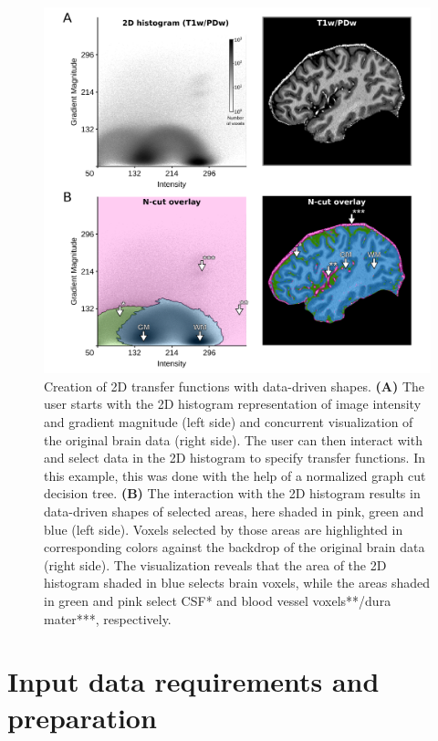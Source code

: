 \begin{figure}[htb!]
\centering
\includegraphics[width=\textwidth]{figures/chapter_02/figure_3.png}
\caption{Creation of 2D transfer functions with data-driven shapes. \textbf{(A)} The user starts with the 2D histogram representation of image intensity and gradient magnitude (left side) and concurrent visualization of the original brain data (right side). The user can then interact with and select data in the 2D histogram to specify transfer functions. In this example, this was done with the help of a normalized graph cut decision tree. \textbf{(B)} The interaction with the 2D histogram results in data-driven shapes of selected areas, here shaded in pink, green and blue (left side). Voxels selected by those areas are highlighted in corresponding colors against the backdrop of the original brain data (right side). The visualization reveals that the area of the 2D histogram shaded in blue selects brain voxels, while the areas shaded in green and pink select CSF* and blood vessel voxels**/dura mater***, respectively.}
\label{Fig3}
\end{figure}

\section{Input data requirements and preparation} \label{DataRequirements}

